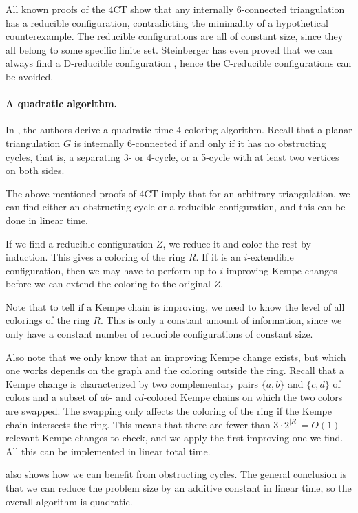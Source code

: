 \documentclass[10pt,a4paper]{article}
\begin{document}
All known proofs of the 4CT show
that any internally 6-connected triangulation has a reducible configuration, contradicting the minimality of a hypothetical counterexample. The reducible configurations are all of constant size, since they all belong to
some specific finite set. Steinberger \cite{steinberger2010unavoidable} has even proved that we can always find a D-reducible configuration \cite{steinberger2010unavoidable}, hence the C-reducible configurations can be avoided.

\paragraph{A quadratic algorithm.}
In \cite{RSST-STOC}, the authors derive a quadratic-time 4-coloring algorithm. 
Recall that a planar triangulation $G$ is internally 6-connected if and only if it has no obstructing cycles, that is, a separating 3- or 4-cycle, or a 5-cycle with at least two vertices on both sides.

The above-mentioned proofs of 4CT imply that for an arbitrary triangulation, we can find either an obstructing cycle or a reducible configuration, and this can be done in linear time.

If we find a reducible configuration $Z$, we reduce it and color the rest by induction. This gives a coloring of the ring $R$. If it is an $i$-extendible configuration, then we may have to perform up to $i$ improving Kempe changes before we can extend the coloring to the original $Z$. 

Note that to tell if a Kempe chain is improving, we need to know the level of all colorings of the ring $R$. This is only a constant amount of information, since we only have a constant number of reducible configurations of constant size.

Also note that we only know that an improving Kempe change exists, but which one works depends on the graph and the coloring outside the ring. Recall that a Kempe change is characterized by two complementary pairs $\{a,b\}$ and $\{c,d\}$ of colors and a subset of $ab$- and $cd$-colored Kempe chains on which the two colors are swapped. The swapping only affects the coloring of the ring if the Kempe chain
intersects the ring. This means that there are fewer than $3\cdot 2^{|R|}=O(1)$ relevant Kempe changes to check, and we apply the first improving one we find. All this can be implemented in linear total time.

\cite{RSST-STOC} also shows how we can benefit from obstructing cycles. The general conclusion is that we can reduce the problem size by an additive constant in linear time, so the overall algorithm is quadratic. 
\end{document}
